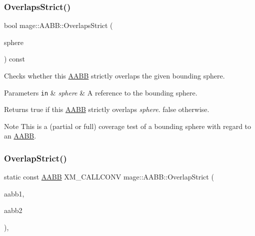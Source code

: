 \subsubsection{\texorpdfstring{Overlaps\+Strict()}{OverlapsStrict()}\hspace{0.1cm}{\footnotesize\ttfamily [2/2]}}
{\footnotesize\ttfamily bool mage\+::\+A\+A\+B\+B\+::\+Overlaps\+Strict (\begin{DoxyParamCaption}\item[{const \hyperlink{classmage_1_1_bounding_sphere}{Bounding\+Sphere} \&}]{sphere }\end{DoxyParamCaption}) const\hspace{0.3cm}{\ttfamily [noexcept]}}

Checks whether this \hyperlink{classmage_1_1_a_a_b_b}{A\+A\+BB} strictly overlaps the given bounding sphere.


\begin{DoxyParams}[1]{Parameters}
\mbox{\tt in}  & {\em sphere} & A reference to the bounding sphere. \\
\hline
\end{DoxyParams}
\begin{DoxyReturn}{Returns}
{\ttfamily true} if this \hyperlink{classmage_1_1_a_a_b_b}{A\+A\+BB} strictly overlaps {\itshape sphere}. {\ttfamily false} otherwise. 
\end{DoxyReturn}
\begin{DoxyNote}{Note}
This is a (partial or full) coverage test of a bounding sphere with regard to an \hyperlink{classmage_1_1_a_a_b_b}{A\+A\+BB}. 
\end{DoxyNote}
\hypertarget{classmage_1_1_a_a_b_b_a43da3c0b22cd1abb9032d0fb41d4e020}{}\label{classmage_1_1_a_a_b_b_a43da3c0b22cd1abb9032d0fb41d4e020} 
\subsubsection{\texorpdfstring{Overlap\+Strict()}{OverlapStrict()}}
{\footnotesize\ttfamily static const \hyperlink{classmage_1_1_a_a_b_b}{A\+A\+BB} X\+M\+\_\+\+C\+A\+L\+L\+C\+O\+NV mage\+::\+A\+A\+B\+B\+::\+Overlap\+Strict (\begin{DoxyParamCaption}\item[{const \hyperlink{classmage_1_1_a_a_b_b}{A\+A\+BB} \&}]{aabb1,  }\item[{const \hyperlink{classmage_1_1_a_a_b_b}{A\+A\+BB} \&}]{aabb2 }\end{DoxyParamCaption})\hspace{0.3cm}{\ttfamily [static]}, {\ttfamily [noexcept]}}


